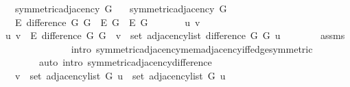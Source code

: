 \begin{isabellebody}
\ \ \ {\isachardoublequoteopen}symmetric{\isacharunderscore}{\kern0pt}adjacency{\isacharprime}{\kern0pt}\ G{}{\isachardoublequoteclose}\isanewline
\ \ \ {\isachardoublequoteopen}symmetric{\isacharunderscore}{\kern0pt}adjacency{\isacharprime}{\kern0pt}\ G{}{\isachardoublequoteclose}\isanewline
\ \ \ {\isachardoublequoteopen}E\ {\isacharparenleft}{\kern0pt}difference\ G{}\ G{}{\isacharparenright}{\kern0pt}\ {\isacharequal}{\kern0pt}\ E\ G{}\ {\isacharminus}{\kern0pt}\ E\ G{}{\isachardoublequoteclose}\isanewline
%
\isadelimproof
%
\endisadelimproof
%
\isatagproof
{}\isamarkupfalse%
\ {\isacharminus}{\kern0pt}\isanewline
\ \ \isacommand{{\isacharbraceleft}{\kern0pt}}\isamarkupfalse%
\ \isamarkupfalse%
\ u\ v\isanewline
\ \ \ \ \isamarkupfalse%
\ {\isachardoublequoteopen}{\isacharbraceleft}{\kern0pt}u{\isacharcomma}{\kern0pt}\ v{\isacharbraceright}{\kern0pt}\ {\isasymin}\ E\ {\isacharparenleft}{\kern0pt}difference\ G{}\ G{}{\isacharparenright}{\kern0pt}\ {\isasymlongleftrightarrow}\ v\ {\isasymin}\ set\ {\isacharparenleft}{\kern0pt}adjacency{\isacharunderscore}{\kern0pt}list\ {\isacharparenleft}{\kern0pt}difference\ G{}\ G{}{\isacharparenright}{\kern0pt}\ u{\isacharparenright}{\kern0pt}{\isachardoublequoteclose}\isanewline
\ \ \ \ \ \ \isamarkupfalse%
\ assms\isanewline
\ \ \ \ \ \ \isamarkupfalse%
\isanewline
\ \ \ \ \ \ \ \ {\isacharparenleft}{\kern0pt}intro\ symmetric{\isacharunderscore}{\kern0pt}adjacency{\isachardot}{\kern0pt}mem{\isacharunderscore}{\kern0pt}adjacency{\isacharunderscore}{\kern0pt}iff{\isacharunderscore}{\kern0pt}edge{\isacharbrackleft}{\kern0pt}symmetric{\isacharbrackright}{\kern0pt}{\isacharparenright}{\kern0pt}\isanewline
\ \ \ \ \ \ \ \ {\isacharparenleft}{\kern0pt}auto\ intro{\isacharcolon}{\kern0pt}\ symmetric{\isacharunderscore}{\kern0pt}adjacency{\isacharunderscore}{\kern0pt}difference{\isacharparenright}{\kern0pt}\isanewline
\ \ \ \ \isamarkupfalse%
\ \isamarkupfalse%
\ {\isachardoublequoteopen}{\isachardot}{\kern0pt}{\isachardot}{\kern0pt}{\isachardot}{\kern0pt}\ {\isasymlongleftrightarrow}\ v\ {\isasymin}\ set\ {\isacharparenleft}{\kern0pt}adjacency{\isacharunderscore}{\kern0pt}list\ G{}\ u{\isacharparenright}{\kern0pt}\ {\isacharminus}{\kern0pt}\ set\ {\isacharparenleft}{\kern0pt}adjacency{\isacharunderscore}{\kern0pt}list\ G{}\ u{\isacharparenright}{\kern0pt}{\isachardoublequoteclose}\isanewline

\end{isabellebody}
